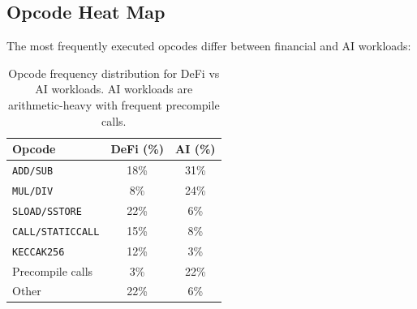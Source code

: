 \subsection{Opcode Heat Map}

The most frequently executed opcodes differ between financial and AI workloads:

\begin{table}[t]
\centering
\begin{tabular}{lcc}
\toprule
\textbf{Opcode} & \textbf{DeFi (\%)} & \textbf{AI (\%)} \\
\midrule
\texttt{ADD/SUB} & 18\% & 31\% \\
\texttt{MUL/DIV} & 8\% & 24\% \\
\texttt{SLOAD/SSTORE} & 22\% & 6\% \\
\texttt{CALL/STATICCALL} & 15\% & 8\% \\
\texttt{KECCAK256} & 12\% & 3\% \\
Precompile calls & 3\% & 22\% \\
Other & 22\% & 6\% \\
\bottomrule
\end{tabular}
\caption{Opcode frequency distribution for DeFi vs AI workloads. AI workloads are arithmetic-heavy with frequent precompile calls.}
\label{tab:opcodes}
\end{table}

